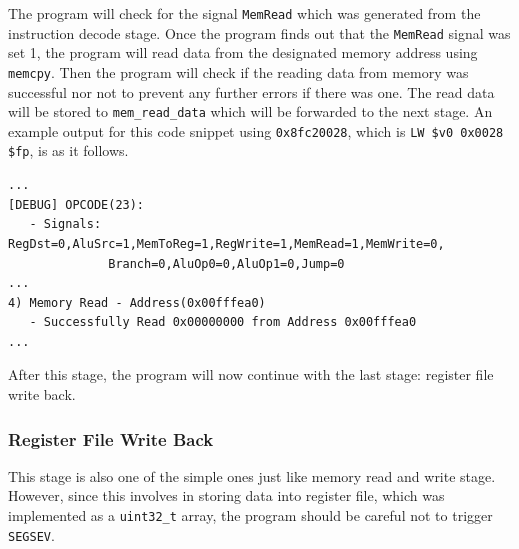 \documentclass{homework}
\begin{document}
The program will check for the signal \texttt{MemRead} which was generated from the instruction decode stage. Once the program finds out that the \texttt{MemRead} signal was set 1, the program will read data from the designated memory address using \texttt{memcpy}. Then the program will check if the reading data from memory was successful nor not to prevent any further errors if there was one. The read data will be stored to \texttt{mem_read_data} which will be forwarded to the next stage. An example output for this code snippet using \texttt{0x8fc20028}, which is \texttt{LW \$v0 0x0028 \$fp}, is as it follows.
\\
\begin{center}
\begin{code}
\begin{verbatim}
...
[DEBUG] OPCODE(23):
   - Signals: RegDst=0,AluSrc=1,MemToReg=1,RegWrite=1,MemRead=1,MemWrite=0,
              Branch=0,AluOp0=0,AluOp1=0,Jump=0
...
4) Memory Read - Address(0x00fffea0)
   - Successfully Read 0x00000000 from Address 0x00fffea0
...
\end{verbatim}
\end{code}
\end{center}
After this stage, the program will now continue with the last stage: register file write back.

\pagebreak
\subsubsection{Register File Write Back}
This stage is also one of the simple ones just like memory read and write stage. However, since this involves in storing data into register file, which was implemented as a \texttt{uint32_t} array, the program should be careful not to trigger \texttt{SEGSEV}. 
\end{document}
